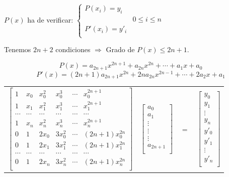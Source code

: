 \documentclass[twoside]{report}
\begin{document}
$P(x)$ ha de verificar:
$\left\{\begin{array}{cc}
P(x_i)=y_i & \\
& 0\leq i \leq n\\
P'(x_i)=y'_i & \\
\end{array} \right.$

Tenemos $2n+2$ condiciones $\Rightarrow$ Grado de $P(x)\leq 2n+1.$

$$P(x)=a_{2n+1}x^{2n+1}+a_{2n} x^{2n}+\cdots+a_1 x+a_0$$
$$P'(x)=(2n+1)a_{2n+1}x^{2n}+2na_{2n}x^{2n-1}+\cdots+2a_2x+a_1$$

\begin{center}
\begin{tabular}{cccc} $\left[ \begin{array}{cccccc}
1&x_0&x_0^2&x_0^3&\cdots&x_0^{2n+1}\\
1&x_1&x_1^2&x_1^3&\cdots&x_1^{2n+1}\\
\cdots&\cdots&\cdots&\cdots&\cdots&\cdots\\
1&x_n&x_n^2&x_n^3&\cdots&x_n^{2n+1}\\
0&1&2x_0&3x_0^2&\cdots&(2n+1)x_0^{2n}\\
0&1&2x_1&3x_1^2&\cdots&(2n+1)x_1^{2n}\\
\cdots&\cdots&\cdots&\cdots&\cdots&\cdots\\
0&1&2x_n&3x_n^2&\cdots&(2n+1)x_n^{2n}\\
\end{array} \right]$ & $\left[ \begin{array}{c} a_0\\a_1\\ \vdots \\ \vdots \\ \vdots \\ a_{2n+1} \\ \end{array} \right] $& $=$ &
$\left[ \begin{array}{c} y_0\\y_1\\ \vdots \\y_n\\ y'_0\\y'_1\\ \vdots \\ y'_n \\
\end{array}\right]$
\end{tabular}
\end{center}
\end{document}
